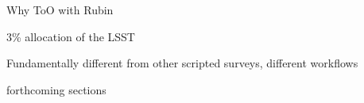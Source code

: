 Why ToO with Rubin

3\% allocation of the LSST

Fundamentally different from other scripted surveys, different workflows

forthcoming sections